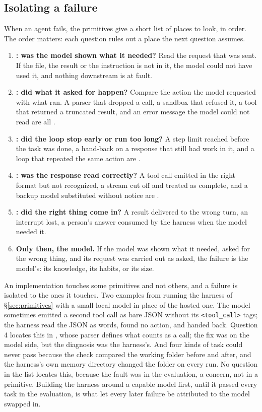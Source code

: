 \subsection{Isolating a failure}
\label{sec:debugging}
When an agent fails, the primitives give a short list of places to look, in order. The order matters: each question rules out a place the next question assumes.
\begin{enumerate}
  \item \textbf{: was the model shown what it needed?} Read the request that was sent. If the file, the result or the instruction is not in it, the model could not have used it, and nothing downstream is at fault.
  \item \textbf{: did what it asked for happen?} Compare the action the model requested with what ran. A parser that dropped a call, a sandbox that refused it, a tool that returned a truncated result, and an error message the model could not read are all .
  \item \textbf{: did the loop stop early or run too long?} A step limit reached before the task was done, a hand-back on a response that still had work in it, and a loop that repeated the same action are .
  \item \textbf{: was the response read correctly?} A tool call emitted in the right format but not recognized, a stream cut off and treated as complete, and a backup model substituted without notice are .
  \item \textbf{: did the right thing come in?} A result delivered to the wrong turn, an interrupt lost, a person's answer consumed by the harness when the model needed it.
  \item \textbf{Only then, the model.} If the model was shown what it needed, asked for the wrong thing, and its request was carried out as asked, the failure is the model's: its knowledge, its habits, or its size.
\end{enumerate}
An implementation touches some primitives and not others, and a failure is isolated to the ones it touches. Two examples from running the harness of \S\ref{sec:primitives} with a small local model in place of the hosted one. The model sometimes emitted a second tool call as bare JSON without its \texttt{<tool\_call>} tags; the harness read the JSON as words, found no action, and handed back. Question 4 locates this in , whose parser defines what counts as a call; the fix was on the model side, but the diagnosis was the harness's. And four kinds of task could never pass because the check compared the working folder before and after, and the harness's own memory directory changed the folder on every run. No question in the list locates this, because the fault was in the evaluation, a concern, not in a primitive. Building the harness around a capable model first, until it passed every task in the evaluation, is what let every later failure be attributed to the model swapped in.

